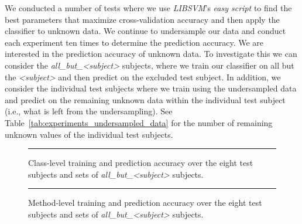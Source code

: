 We conducted a number of tests where we use \emph{LIBSVM}'s \emph{easy script} to find the best parameters that maximize cross-validation accuracy and then apply the classifier to unknown data. We continue to undersample our data and conduct each experiment ten times to determine the prediction accuracy. We are interested in the prediction accuracy of unknown data. To investigate this we can consider the \emph{all\_but\_<subject>} subjects, where we train our classifier on all but the \emph{<subject>} and then predict on the excluded test subject. In addition, we consider the individual test subjects where we train using the undersampled data and predict on the remaining unknown data within the individual test subject (i.e., what is left from the undersampling). See Table~\ref{tab:experiments_undersampled_data} for the number of remaining unknown values of the individual test subjects.

\begin{figure}[!tb]
  \centering
  \begin{adjustbox}{max size={.95\textwidth}{.95\textheight}}
    
  \end{adjustbox}
  \caption{Class-level training and prediction accuracy over the eight test subjects and sets of \emph{all\_but\_<subject>} subjects.}
  \vspace{2mm}
  \hrule
  \label{fig:prediction_class_graph}
\end{figure}

\begin{figure}[!tb]
  \centering
  \begin{adjustbox}{max size={.95\textwidth}{.95\textheight}}
    
  \end{adjustbox}
  \caption{Method-level training and prediction accuracy over the eight test subjects and sets of \emph{all\_but\_<subject>} subjects.}
  \vspace{2mm}
  \hrule
  \label{fig:prediction_method_graph}
\end{figure}

